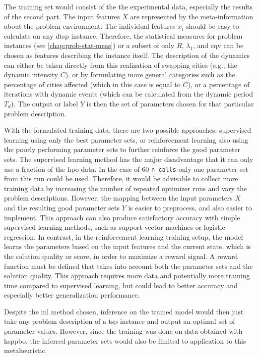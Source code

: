 The training set would consist of the the experimental data, especially the results of the second part. The input features $X$ are represented by the meta-information about the problem environment. The individual features $x_i$ should be easy to calculate on any \gls{dtsp} instance. Therefore, the statistical measures for problem instances (see \cref{chap:prob-stat-meas}) or a subset of only $R$, $\lambda_1$, and \gls{cqv} can be chosen as features describing the instance itself. The description of the dynamics can either be taken directly from this realization of swapping cities (e.g., the dynamic intensity $C$), or by formulating more general categories such as the percentage of cities affected (which in this case is equal to $C$), or a percentage of iterations with dynamic events (which can be calculated from the dynamic period $T_d$).
The output or label $Y$ is then the set of parameters chosen for that particular problem description.

With the formulated training data, there are two possible approaches: supervised learning using only the best parameter sets, or reinforcement learning also using the poorly performing parameter sets to further reinforce the good parameter sets.
The supervised learning method has the major disadvantage that it can only use a fraction of the \gls{hpo} data. In the case of 60 \texttt{n\_calls} only one parameter set from this run could be used. Therefore, it would be advisable to collect more training data by increasing the number of repeated optimizer runs and vary the problem descriptions. However, the mapping between the input parameters $X$ and the resulting good parameter sets $Y$ is easier to preprocess, and also easier to implement. This approach can also produce satisfactory accuracy with simple supervised learning methods, such as support-vector machines or logistic regression. 
In contrast, in the reinforcement learning training setup, the model learns the parameters based on the input features and the current state, which is the solution quality or score, in order to maximize a reward signal. A reward function must be defined that takes into account both the parameter sets and the solution quality. This approach requires more data and potentially more training time compared to supervised learning, but could lead to better accuracy and especially better generalization performance. 

Despite the \gls{ml} method chosen, inference on the trained model would then just take any problem description of a \gls{tsp} instance and output an optimal set of parameter values. However, since the training was done on data obtained with \gls{hsppbo}, the inferred parameter sets would also be limited to application to this metaheuristic.
